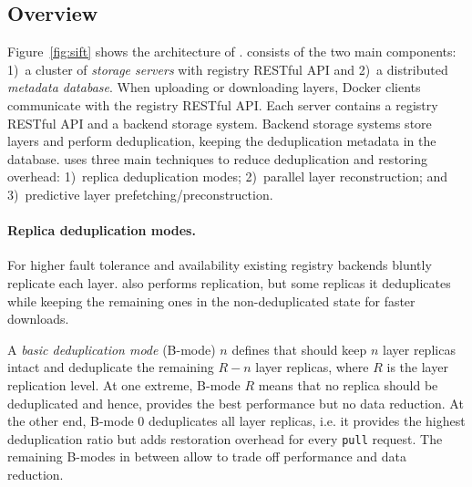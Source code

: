 \subsection{Overview}
\label{sec:overview}



Figure~\ref{fig:sift} shows the architecture of \sysname.
%
\sysname consists of the two main components: %
1)~a cluster of \emph{storage servers}
with registry RESTful API and 2)~a distributed
\emph{metadata database}. 
%
When uploading or downloading layers, 
Docker clients communicate with the
registry RESTful API.
%
%
Each server contains a registry RESTful API and a backend storage system.
%
Backend storage systems store
layers and perform deduplication, keeping the deduplication metadata in the
database.
%
%
%
\sysname uses three main techniques to reduce deduplication and restoring overhead:
1)~replica deduplication modes; 2)~parallel layer reconstruction; and
3)~predictive layer prefetching/preconstruction.




\paragraph{Replica deduplication modes.}
%
For higher fault tolerance and availability existing registry backends bluntly
replicate  each layer.
%
\sysname also performs replication, but some replicas it deduplicates while
keeping the remaining ones in the non-deduplicated state for faster downloads.

A \emph{basic deduplication mode} (B-mode) $n$ defines that \sysname should
keep $n$ layer replicas intact and deduplicate the remaining $R-n$ layer
replicas, where $R$ is the layer replication level.
%
%
At one extreme, B-mode $R$ means that no replica should be deduplicated and
hence, provides the best performance but no data reduction.
%
At the other end, B-mode $0$ deduplicates all layer replicas, i.e. it provides
the highest deduplication ratio but adds restoration overhead for every
\texttt{pull} request.
%
The remaining B-modes in between allow to trade off performance and data
reduction.
%

